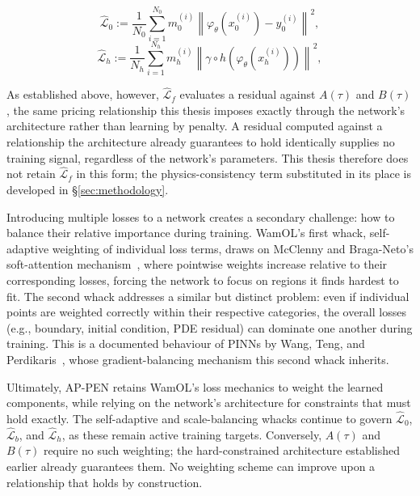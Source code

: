 \documentclass[sigconf, authorversion=true, nonacm=true]{acmart}
\begin{document}
\begin{equation}
    \hat{\mathcal{L}}_0 := \frac{1}{N_0} \sum_{i=1}^{N_0} m_0^{(i)} \left\| \varphi_\theta\!\left(x_0^{(i)}\right) - y_0^{(i)} \right\|^2, \label{eq:dcpinn-L0}
\end{equation}
\begin{equation}
    \hat{\mathcal{L}}_h := \frac{1}{N_h} \sum_{i=1}^{N_h} m_h^{(i)} \left\| \gamma \circ h\!\left(\varphi_\theta\!\left(x_h^{(i)}\right)\right) \right\|^2, \label{eq:dcpinn-Lh}
\end{equation}

As established above, however, $\hat{\mathcal{L}}_f$ evaluates a residual against $A(\tau)$ and $B(\tau)$, the same pricing relationship this thesis imposes exactly through the network's architecture rather than learning by penalty. A residual computed against a relationship the architecture already guarantees to hold identically supplies no training signal, regardless of the network's parameters. This thesis therefore does not retain $\hat{\mathcal{L}}_f$ in this form; the physics-consistency term substituted in its place is developed in \S\ref{sec:methodology}.

Introducing multiple losses to a network creates a secondary challenge: how to balance their relative importance during training. WamOL's first whack, self-adaptive weighting of individual loss terms, draws on McClenny and Braga-Neto's soft-attention mechanism~\cite{braga2021self}, where pointwise weights increase relative to their corresponding losses, forcing the network to focus on regions it finds hardest to fit. The second whack addresses a similar but distinct problem: even if individual points are weighted correctly within their respective categories, the overall losses (e.g., boundary, initial condition, PDE residual) can dominate one another during training. This is a documented behaviour of PINNs by Wang, Teng, and Perdikaris~\cite{wang2021understanding}, whose gradient-balancing mechanism this second whack inherits. 

Ultimately, AP-PEN retains WamOL's loss mechanics to weight the learned components, while relying on the network's architecture for constraints that must hold exactly. The self-adaptive and scale-balancing whacks continue to govern $\hat{\mathcal{L}}_0$, $\hat{\mathcal{L}}_b$, and $\hat{\mathcal{L}}_h$, as these remain active training targets. Conversely, $A(\tau)$ and $B(\tau)$ require no such weighting; the hard-constrained architecture established earlier already guarantees them. No weighting scheme can improve upon a relationship that holds by construction.
\end{document}
